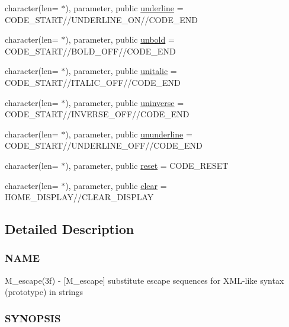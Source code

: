 \begin{DoxyCompactItemize}
\item 
character(len= $\ast$), parameter, public \mbox{\hyperlink{namespacem__escape_acee3a3082a12ed884ef99019d0f30f86}{underline}} = C\+O\+D\+E\+\_\+\+S\+T\+A\+RT//U\+N\+D\+E\+R\+L\+I\+N\+E\+\_\+\+ON//C\+O\+D\+E\+\_\+\+E\+ND
\item 
character(len= $\ast$), parameter, public \mbox{\hyperlink{namespacem__escape_aaa2404c29a0f5840417e71a8219a118c}{unbold}} = C\+O\+D\+E\+\_\+\+S\+T\+A\+RT//B\+O\+L\+D\+\_\+\+O\+FF//C\+O\+D\+E\+\_\+\+E\+ND
\item 
character(len= $\ast$), parameter, public \mbox{\hyperlink{namespacem__escape_a6b95826bb2793069e7fa8f8386bdb520}{unitalic}} = C\+O\+D\+E\+\_\+\+S\+T\+A\+RT//I\+T\+A\+L\+I\+C\+\_\+\+O\+FF//C\+O\+D\+E\+\_\+\+E\+ND
\item 
character(len= $\ast$), parameter, public \mbox{\hyperlink{namespacem__escape_a067207898e3ef5118bc1cad83f40dad8}{uninverse}} = C\+O\+D\+E\+\_\+\+S\+T\+A\+RT//I\+N\+V\+E\+R\+S\+E\+\_\+\+O\+FF//C\+O\+D\+E\+\_\+\+E\+ND
\item 
character(len= $\ast$), parameter, public \mbox{\hyperlink{namespacem__escape_adbaa599772d5df6567d75188ac3258bf}{ununderline}} = C\+O\+D\+E\+\_\+\+S\+T\+A\+RT//U\+N\+D\+E\+R\+L\+I\+N\+E\+\_\+\+O\+FF//C\+O\+D\+E\+\_\+\+E\+ND
\item 
character(len= $\ast$), parameter, public \mbox{\hyperlink{namespacem__escape_ae02be34bb084db8024b234bc87058d3a}{reset}} = C\+O\+D\+E\+\_\+\+R\+E\+S\+ET
\item 
character(len= $\ast$), parameter, public \mbox{\hyperlink{namespacem__escape_a49210f3a0332fb37df08c519b3252bef}{clear}} = H\+O\+M\+E\+\_\+\+D\+I\+S\+P\+L\+AY//C\+L\+E\+A\+R\+\_\+\+D\+I\+S\+P\+L\+AY
\end{DoxyCompactItemize}


\subsection{Detailed Description}
\subsubsection*{N\+A\+ME}

M\+\_\+escape(3f) -\/ \mbox{[}M\+\_\+escape\mbox{]} substitute escape sequences for X\+M\+L-\/like syntax (prototype) in strings 

\subsubsection*{S\+Y\+N\+O\+P\+S\+IS}


